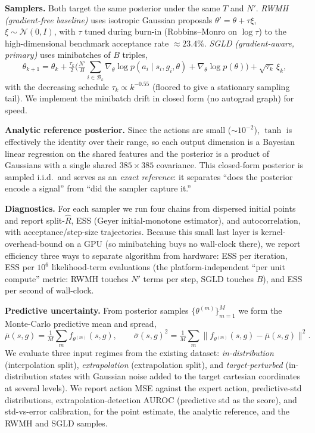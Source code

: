 \documentclass[11pt]{article}
\begin{document}
\textbf{Samplers.} Both target the same posterior under the same $T$ and $N'$.
\emph{RWMH (gradient-free baseline)} uses isotropic Gaussian proposals
$\theta'=\theta+\tau\xi$, $\xi\sim\mathcal{N}(0,I)$, with $\tau$ tuned during burn-in (Robbins--Monro on
$\log\tau$) to the high-dimensional benchmark acceptance rate $\approx 23.4\%$.
\emph{SGLD (gradient-aware, primary)} uses minibatches of $B$ triples,
\[
\theta_{k+1}=\theta_k+\tfrac{\tau_k}{2}\Big(\tfrac{N'}{B}\!\!\sum_{i\in\mathcal{B}_k}\!\nabla_\theta\log
p(a_i\mid s_i,g_i,\theta)+\nabla_\theta\log p(\theta)\Big)+\sqrt{\tau_k}\,\xi_k,
\]
with the decreasing schedule $\tau_k\propto k^{-0.55}$ (floored to give a stationary sampling tail). We
implement the minibatch drift in closed form (no autograd graph) for speed.

\textbf{Analytic reference posterior.} Since the actions are small ($\sim\!10^{-2}$), $\tanh$ is
effectively the identity over their range, so each output dimension is a Bayesian linear regression on
the shared features and the posterior is a product of Gaussians with a single shared $385\times385$
covariance. This closed-form posterior is sampled i.i.d.\ and serves as an \emph{exact reference}: it
separates ``does the posterior encode a signal'' from ``did the sampler capture it.''

\textbf{Diagnostics.} For each sampler we run four chains from dispersed initial points and report
split-$\hat R$, ESS (Geyer initial-monotone estimator), and autocorrelation, with acceptance/step-size
trajectories. Because this small last layer is kernel-overhead-bound on a GPU (so minibatching buys no
wall-clock there), we report efficiency three ways to separate algorithm from hardware: ESS per
iteration, ESS per $10^6$ likelihood-term evaluations (the platform-independent ``per unit compute''
metric: RWMH touches $N'$ terms per step, SGLD touches $B$), and ESS per second of wall-clock.

\textbf{Predictive uncertainty.} From posterior samples $\{\theta^{(m)}\}_{m=1}^M$ we form the
Monte-Carlo predictive mean and spread,
\[
\bar\mu(s,g)=\tfrac1M\sum_m f_{\theta^{(m)}}(s,g),\qquad
\bar\sigma(s,g)^2=\tfrac1M\sum_m\big\|f_{\theta^{(m)}}(s,g)-\bar\mu(s,g)\big\|^2 .
\]
We evaluate three input regimes from the existing dataset: \emph{in-distribution} (interpolation split),
\emph{extrapolation} (extrapolation split), and \emph{target-perturbed} (in-distribution states with
Gaussian noise added to the target cartesian coordinates at several levels). We report action MSE against
the expert action, predictive-std distributions, extrapolation-detection AUROC (predictive std as the
score), and std-vs-error calibration, for the point estimate, the analytic reference, and the RWMH and
SGLD samples.
\end{document}

